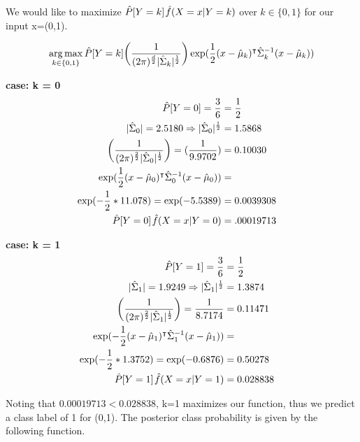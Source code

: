 \documentclass{jhwhw}
\DeclareMathOperator*{\argmax}{arg\,max}
\begin{document}
    \bigbreak
    We would like to maximize $\Hat{P}[Y=k]\hspace{1pt}\Hat{f}(X=x|Y=k)$ 
	over $k\in\{0,1\}$ for our input x=(0,1).

    $$
	\argmax_{k\in\{0,1\}} 
	\Hat{P}[Y=k]
	\biggr(\frac{1}{(2\pi)^{\frac{d}{2}}{|\Hat{\Sigma}_k}|^{\frac{1}{2}}}\biggr)
	\exp(\frac{1}{2}(x - \Hat{\mu}_k)^\intercal \Hat{\Sigma}_k^{-1} (x - \Hat{\mu}_k))
    $$

    \textbf{case: k = 0} \\

    \begin{align*}
	\Hat{P}[Y=0] = \frac{3}{6} &= \frac{1}{2} &\\
	|\Hat{\Sigma}_0| = 2.5180 \Rightarrow |\Hat{\Sigma}_0|^{\frac{1}{2}} &= 1.5868 &\\
	\biggr(\frac{1}{(2\pi)^{\frac{2}{2}}{|\Hat{\Sigma}_0}|^{\frac{1}{2}}}\biggr) =
	    (\frac{1}{9.9702}) &= 0.10030 &\\
	\exp(\frac{1}{2}(x - \Hat{\mu}_0)^\intercal \Hat{\Sigma}_0^{-1} (x - \Hat{\mu}_0)) &=  &\\
	    \exp(-\frac{1}{2} * 11.078) = \exp(-5.5389) &= 0.0039308 &\\
	\Hat{P}[Y=0]\hspace{1pt}\Hat{f}(X=x|Y=0) &= .00019713
    \end{align*}

    \textbf{case: k = 1} \\

    \begin{align*}
	\Hat{P}[Y=1] = \frac{3}{6} &= \frac{1}{2} &\\
	|\Hat{\Sigma}_1| = 1.9249 \Rightarrow |\Hat{\Sigma}_1|^{\frac{1}{2}} &= 1.3874 &\\
	\biggr(\frac{1}{(2\pi)^{\frac{2}{2}}{|\Hat{\Sigma}_1}|^{\frac{1}{2}}}\biggr) =
	    \frac{1}{8.7174} &= 0.11471 &\\
	\exp(-\frac{1}{2}(x - \Hat{\mu}_1)^\intercal \Hat{\Sigma}_1^{-1} (x - \Hat{\mu}_1)) &= &\\
	    \exp(-\frac{1}{2} * 1.3752) = \exp(-0.6876) &= 0.50278 &\\
	\Hat{P}[Y=1]\hspace{1pt}\Hat{f}(X=x|Y=1) &= 0.028838
    \end{align*}

    \clearpage
    Noting that $0.00019713 < 0.028838$, k=1 maximizes our function, thus we 
    predict a class label of 1 for (0,1).
    The posterior class probability is given by the following function.
\end{document}
